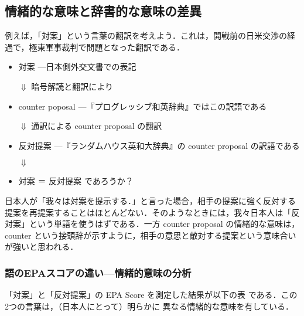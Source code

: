 \documentclass[japanese]{jnlp_1.3d}
\begin{document}
\subsection{情緒的な意味と辞書的な意味の差異}
例えば，「対案」という言葉の翻訳を考えよう．これは，開戦前の日米交渉の経
過で，極東軍事裁判で問題となった翻訳である．
\begin{itemize}
 \item 対案 {\small —日本側外交文書での表記}

       $\Downarrow$   暗号解読と翻訳により
       
 \item counter poposal {\small —『プログレッシブ和英辞典』ではこの訳語である}

       $\Downarrow$  通訳による counter proposal の翻訳


 \item 反対提案 {\small —『ランダムハウス英和大辞典』の counter proposal
       の訳語である}


       $\Downarrow$  \hspace{1cm}{\small つまり，対案$\rightarrow$counter
       proposal$\rightarrow$反対提案と翻訳／再翻訳されたならば，}

 \item 対案 ＝ 反対提案 であろうか？
\end{itemize}
日本人が「我々は対案を提示する．」と言った場合，相手の提案に強く反対する
提案を再提案することはほとんどない．そのようなときには，我々日本人は「反
対案」という単語を使うはずである．一方 counter proposal の情緒的な意味は，counter という接頭辞が示すように，相手の意思と敵対する提案という意味合いが強いと思われる．





\subsubsection{語のEPAスコアの違い—情緒的意味の分析}
「対案」と「反対提案」の EPA Score を測定した結果が以下の表 である．この
2つの言葉は，（日本人にとって）明らかに 異なる情緒的な意味を有している．
\end{document}
